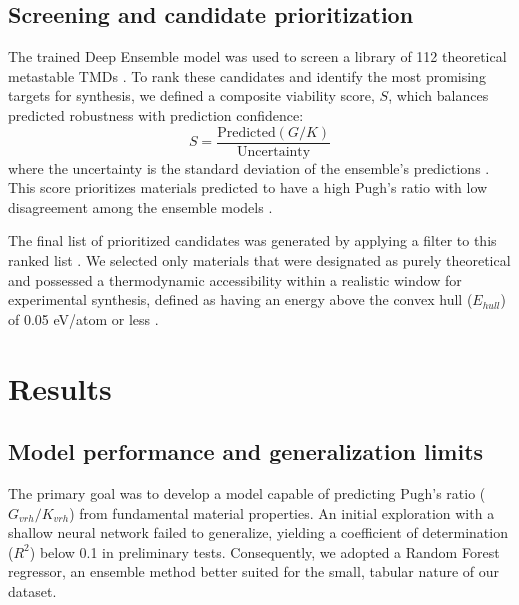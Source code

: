 \documentclass[]{article}
\begin{document}
\subsection{Screening and candidate prioritization}
The trained Deep Ensemble model was used to screen a library of 112 theoretical metastable TMDs \citep{liu2024high,samanta2022rapidscreeninghighthroughputground}. To rank these candidates and identify the most promising targets for synthesis, we defined a composite viability score, $S$, which balances predicted robustness with prediction confidence: \citep{xin2025bridgingtheoryexperimentmaterials,Lee_2024,Zhang_2026,jang2021structurebased,song2025accurate,Niyongabo_Rubungo_2025}
\begin{equation}
S = \frac{\text{Predicted}(G/K)}{\text{Uncertainty}}
\end{equation}
where the uncertainty is the standard deviation of the ensemble's predictions \citep{Dutschmann_2023}. This score prioritizes materials predicted to have a high Pugh's ratio with low disagreement among the ensemble models \citep{tran2020methodscomparinguncertaintyquantifications}.

The final list of prioritized candidates was generated by applying a filter to this ranked list \citep{Das_2025}. We selected only materials that were designated as purely theoretical and possessed a thermodynamic accessibility within a realistic window for experimental synthesis, defined as having an energy above the convex hull ($E_{hull}$) of 0.05 eV/atom or less \citep{Anelli_2018,prein2025synthesizabilityguidedpipelinematerialsdiscovery,schlesinger2026thermodynamicassessmentmachinelearning,McDermott_2023}.

\section{Results}
\label{sec:results}
\subsection{Model performance and generalization limits}

The primary goal was to develop a model capable of predicting Pugh's ratio ($G_{vrh}/K_{vrh}$) from fundamental material properties. An initial exploration with a shallow neural network failed to generalize, yielding a coefficient of determination ($R^2$) below 0.1 in preliminary tests. Consequently, we adopted a Random Forest regressor, an ensemble method better suited for the small, tabular nature of our dataset.
\end{document}
